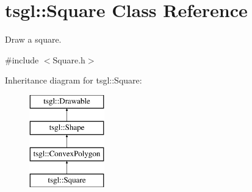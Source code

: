 \hypertarget{classtsgl_1_1_square}{}\section{tsgl\+:\+:Square Class Reference}
\label{classtsgl_1_1_square}


Draw a square.  




{\ttfamily \#include $<$Square.\+h$>$}

Inheritance diagram for tsgl\+:\+:Square\+:\begin{figure}[H]
\begin{center}
\leavevmode
\includegraphics[height=4.000000cm]{classtsgl_1_1_square}
\end{center}
\end{figure}
